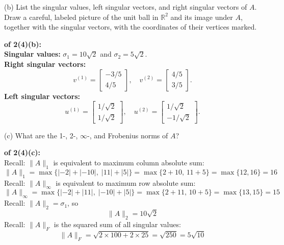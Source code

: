\documentclass[lang=cn,11pt]{elegantbook}
\begin{document}
    (b) List the singular values, left singular vectors, and right singular vectors of $A$. Draw a careful, labeled picture of the unit ball in $\mathbb{R}^2$ and its image under $A$, together with the singular vectors, with the coordinates of their vertices marked.\\
    \begin{solution}
        \textbf{of 2(4)(b):}\\
\textbf{Singular values:} \(\sigma_1=10\sqrt2\) and \(\sigma_2=5\sqrt2.\)\\
\textbf{Right singular vectors:} \[
  v^{(1)}=\begin{bmatrix} -3/5 \\ 4/5 \end{bmatrix},\quad
  v^{(2)}=\begin{bmatrix} 4/5 \\ 3/5 \end{bmatrix}.
  \]\textbf{Left singular vectors:} \[
  u^{(1)}=\begin{bmatrix} 1/\sqrt2 \\ 1/\sqrt2 \end{bmatrix},\quad
  u^{(2)}=\begin{bmatrix} 1/\sqrt2 \\ -1/\sqrt2 \end{bmatrix}.
  \]
        
    \end{solution}

    (c) What are the 1-, 2-, $\infty$-, and Frobenius norms of $A$?
    \begin{solution}
        \textbf{of 2(4)(c):}\\
        Recall: \(\|A\|_1\) is equivalent to maximum column absolute sum: \[
   \|A\|_1=\max\{|-2|+|-10|,\;|11|+|5|\}=\max\{2+10,\,11+5\}=\max\{12,16\}=16
   \]
Recall: \(\|A\|_\infty\) is equivalent to maximum row absolute sum: \[
   \|A\|_\infty=\max\{|-2|+|11|,\;|{-10}|+|5|\}=\max\{2+11,\,10+5\}=\max\{13,15\}=15
   \]
Recall: \(\|A\|_2 = \sigma_1\), so \[
   \|A\|_2=10\sqrt2
   \]
Recall: \(\|A\|_F\) is the squared sum of all singular values:  \[
   \|A\|_F=\sqrt{2\times 100 + 2\times 25}=\sqrt{250}=5\sqrt{10}
   \]

    \end{solution}
\end{document}

